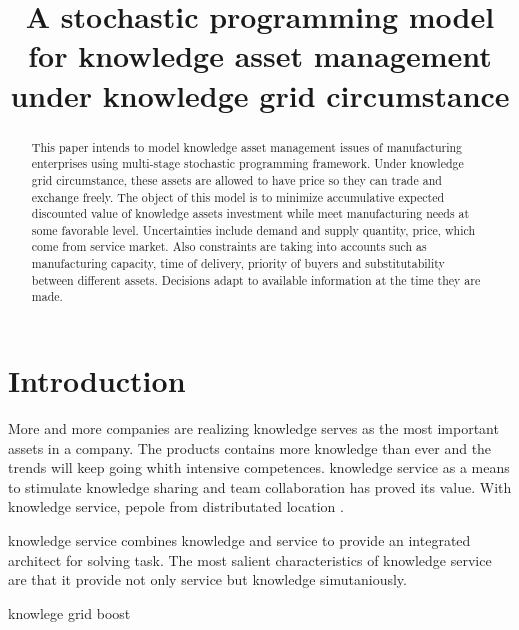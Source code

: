 \documentclass{article}
\begin{document}
\title {A stochastic programming model for knowledge asset management under knowledge grid circumstance}
\maketitle
\begin{abstract}
  This paper intends to model knowledge asset management issues of manufacturing enterprises using multi-stage stochastic programming framework. Under knowledge grid circumstance, these assets are allowed to have price so they can trade and exchange freely. The object of this model is to minimize accumulative expected discounted value of knowledge assets investment while meet manufacturing needs at some favorable level. Uncertainties include demand and supply quantity, price, which come from service market. Also constraints are taking into accounts such as manufacturing capacity, time of delivery, priority of buyers and substitutability between different assets. Decisions adapt to available information at the time they are made.
\end{abstract}

\section{Introduction}
\label{sec:introduction}

 More and more companies are realizing knowledge serves as the most important assets in a company. The products contains more knowledge than ever and the trends will keep going whith intensive competences. knowledge service as a means to stimulate knowledge sharing and team collaboration has proved its value. With knowledge service, pepole from distributated location .

knowledge service combines knowledge and service to provide an integrated architect for solving task. The most salient characteristics of knowledge service are that it provide not only service but knowledge simutaniously. 

knowlege grid  boost
\end{document}
